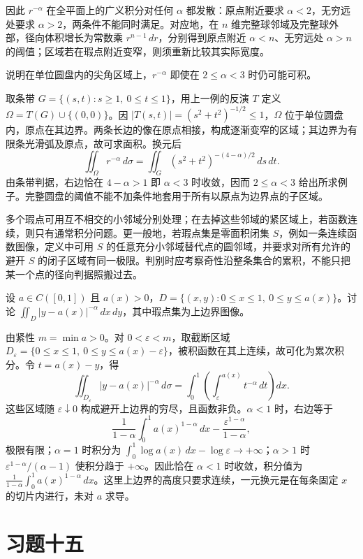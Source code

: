 因此 $r^{-\alpha}$ 在全平面上的广义积分对任何 $\alpha$ 都发散：原点附近要求 $\alpha<2$，无穷远处要求 $\alpha>2$，两条件不能同时满足。对应地，在 $n$ 维完整球邻域及完整球外部，径向体积增长为常数乘 $r^{n-1}\,dr$，分别得到原点附近 $\alpha<n$、无穷远处 $\alpha>n$ 的阈值；区域若在瑕点附近变窄，则须重新比较其实际宽度。

\begin{example}
\label{ex:multiple-singular-thin-domain}
说明在单位圆盘内的尖角区域上，$r^{-\alpha}$ 即使在 $2\leq\alpha<3$ 时仍可能可积。
\end{example}
\begin{solve}
取条带 $G=\{(s,t):s\geq1,\ 0\leq t\leq1\}$，用上一例的反演 $T$ 定义 $\Omega=T(G)\cup\{(0,0)\}$。因 $|T(s,t)|=(s^2+t^2)^{-1/2}\leq1$，$\Omega$ 位于单位圆盘内，原点在其边界。两条长边的像在原点相接，构成逐渐变窄的区域；其边界为有限条光滑弧及原点，故可求面积。换元后
\[
    \iint_\Omega r^{-\alpha}\,d\sigma
    =\iint_G(s^2+t^2)^{-(4-\alpha)/2}\,ds\,dt.
\]
由条带判据，右边恰在 $4-\alpha>1$ 即 $\alpha<3$ 时收敛，因而 $2\leq\alpha<3$ 给出所求例子。完整圆盘的阈值不能不加条件地套用于所有以原点为边界点的子区域。
\end{solve}

多个瑕点可用互不相交的小邻域分别处理；在去掉这些邻域的紧区域上，若函数连续，则只有通常积分问题。更一般地，若瑕点集是零面积闭集 $S$，例如一条连续函数图像，定义中可用 $S$ 的任意充分小邻域替代点的圆邻域，并要求对所有允许的避开 $S$ 的闭子区域有同一极限。判别时应考察奇性沿整条集合的累积，不能只把某一个点的径向判据照搬过去。

\begin{example}
\label{ex:multiple-singular-curve}
设 $a\in C([0,1])$ 且 $a(x)>0$，$D=\{(x,y):0\leq x\leq1,\ 0\leq y\leq a(x)\}$。讨论 $\displaystyle\iint_D|y-a(x)|^{-\alpha}\,dx\,dy$，其中瑕点集为上边界图像。
\end{example}
\begin{solve}
由紧性 $m=\min a>0$。对 $0<\varepsilon<m$，取截断区域 $D_\varepsilon=\{0\leq x\leq1,\ 0\leq y\leq a(x)-\varepsilon\}$，被积函数在其上连续，故可化为累次积分。令 $t=a(x)-y$，得
\[
    \iint_{D_\varepsilon}|y-a(x)|^{-\alpha}\,d\sigma
    =\int_0^1\left(\int_\varepsilon^{a(x)}t^{-\alpha}\,dt\right)dx.
\]
这些区域随 $\varepsilon\downarrow0$ 构成避开上边界的穷尽，且函数非负。$\alpha<1$ 时，右边等于
\[
    \frac1{1-\alpha}\int_0^1a(x)^{1-\alpha}\,dx
    -\frac{\varepsilon^{1-\alpha}}{1-\alpha},
\]
极限有限；$\alpha=1$ 时积分为 $\int_0^1\log a(x)\,dx-\log\varepsilon\to+\infty$；$\alpha>1$ 时 $\varepsilon^{1-\alpha}/(\alpha-1)$ 使积分趋于 $+\infty$。因此恰在 $\alpha<1$ 时收敛，积分值为 $\frac1{1-\alpha}\int_0^1a(x)^{1-\alpha}\,dx$。这里上边界的高度只要求连续，一元换元是在每条固定 $x$ 的切片内进行，未对 $a$ 求导。
\end{solve}

\section*{习题十五}
